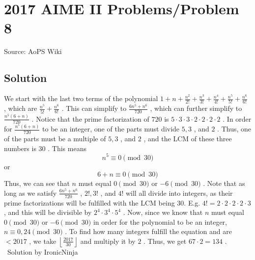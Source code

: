 \documentclass[12pt]{article}
\begin{document}
\section*{{2017 AIME II Problems/Problem 8}}
Source: AoPS Wiki

\subsection*{Solution}
We start with the last two terms of the polynomial $1+n+\frac{n^2}{2!}+\frac{n^3}{3!}+\frac{n^4}{4!}+\frac{n^5}{5!}+\frac{n^6}{6!}$ , which are $\frac{n^5}{5!}+\frac{n^6}{6!}$ . This can simplify to $\frac{6n^5+n^6}{720}$ , which can further simplify to $\frac{n^5(6+n)}{720}$ . Notice that the prime factorization of $720$ is $5\cdot3\cdot3\cdot2\cdot2\cdot2\cdot2$ . In order for $\frac{n^5(6+n)}{720}$ to be an integer, one of the parts must divide $5, 3$ , and $2$ . Thus, one of the parts must be a multiple of $5, 3$ , and $2$ , and the LCM of these three numbers is $30$ . This means \[n^5 \equiv 0\pmod{30}\] or \[6+n \equiv 0\pmod{30}\] Thus, we can see that $n$ must equal $0\pmod{30}$ or $-6\pmod{30}$ . Note that as long as we satisfy $\frac{6n^5+n^6}{720}$ , $2!, 3!$ , and $4!$ will all divide into integers, as their prime factorizations will be fulfilled with the LCM being 30. E.g. $4! = 2\cdot2\cdot2\cdot2\cdot3$ , and this will be divisible by $2^4\cdot3^4\cdot5^4$ . Now, since we know that $n$ must equal $0\pmod{30}$ or $-6\pmod{30}$ in order for the polynomial to be an integer, $n\equiv0, 24\pmod{30}$ . To find how many integers fulfill the equation and are $<2017$ , we take $\left \lfloor\frac{2017}{30} \right \rfloor$ and multiply it by $2$ . Thus, we get $67\cdot2=\boxed{134}$ . ~Solution by IronicNinja~
\end{document}
